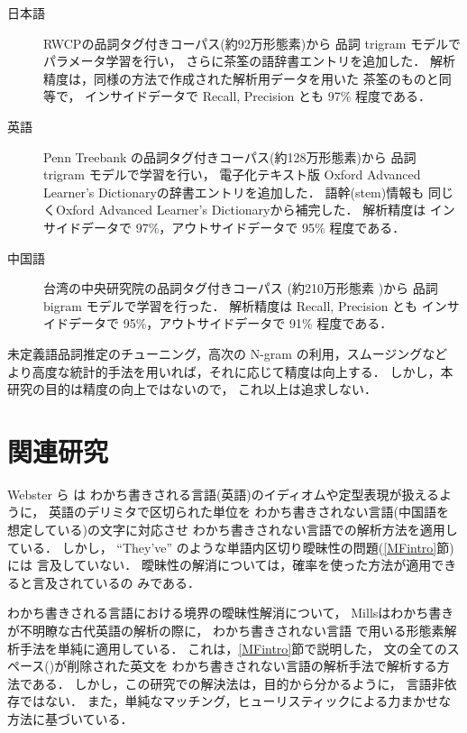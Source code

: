 \begin{description}
\item[日本語]
  RWCPの品詞タグ付きコーパス\cite{IPA97}(約92万形態素)から
  品詞 trigram モデルでパラメータ学習を行い，
  さらに茶筌\cite{ChaSen99}の語辞書エントリを追加した．
  解析精度は，同様の方法で作成された解析用データを用いた
  茶筌のものと同等で，
  インサイドデータで Recall, Precision とも 97\% 程度である．

\item[英語]
  Penn Treebank\cite{PennTreebank90}
  の品詞タグ付きコーパス(約128万形態素)から
  品詞 trigram モデルで学習を行い，
  電子化テキスト版
  Oxford Advanced Learner's Dictionary\cite{OALD92}の辞書エントリを追加した．
  語幹(stem)情報も
  同じくOxford Advanced Learner's Dictionaryから補完した．
  解析精度は
  インサイドデータで 97\%，アウトサイドデータで 95\% 程度である．
  
\item[中国語]
  台湾の中央研究院の品詞タグ付きコーパス\cite{CKIP-TR9502}
  (約210万形態素
  )から
  品詞 bigram モデルで学習を行った．
  解析精度は Recall, Precision とも 
  インサイドデータで 95\%，アウトサイドデータで 91\% 程度である．

\end{description}

未定義語品詞推定のチューニング，高次の N-gram の利用，スムージングなど
より高度な統計的手法を用いれば，それに応じて精度は向上する．
しかし，本研究の目的は精度の向上ではないので，
これ以上は追求しない．



\section{関連研究}

Webster ら\cite{Webster92} は
わかち書きされる言語(英語)のイディオムや定型表現が扱えるように，
英語のデリミタで区切られた単位を
わかち書きされない言語(中国語を想定している)の文字に対応させ
わかち書きされない言語での解析方法を適用している．
しかし，
``They've'' のような単語内区切り曖昧性の問題(\ref{MFintro}節)には
言及していない．
曖昧性の解消については，確率を使った方法が適用できると言及されているの
みである．

わかち書きされる言語における境界の曖昧性解消について，
Millsはわかち書きが不明瞭な古代英語の解析の際に，
わかち書きされない言語
で用いる形態素解析手法を単純に適用している\cite{Mills98}．
これは，\ref{MFintro}節で説明した，
文の全てのスペース({\delimi})が削除された英文を
わかち書きされない言語の解析手法で解析する方法である．
しかし，この研究での解決法は，目的から分かるように，
言語非依存ではない．
また，単純なマッチング，ヒューリスティックによる力まかせな
方法に基づいている．



